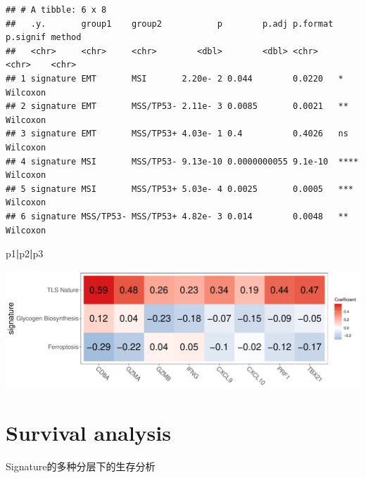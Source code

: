 \documentclass[
  12pt,
]{book}
\newenvironment{Shaded}{\begin{snugshade}}{\end{snugshade}}
\newcommand{\NormalTok}[1]{#1}
\newcommand{\SpecialCharTok}[1]{\textcolor[rgb]{0.81,0.36,0.00}{\textbf{#1}}}
\theoremstyle{definition}
\theoremstyle{definition}
\theoremstyle{definition}
\theoremstyle{definition}
\theoremstyle{remark}
\begin{document}
\begin{verbatim}
## # A tibble: 6 x 8
##   .y.       group1    group2           p        p.adj p.format p.signif method  
##   <chr>     <chr>     <chr>        <dbl>        <dbl> <chr>    <chr>    <chr>   
## 1 signature EMT       MSI       2.20e- 2 0.044        0.0220   *        Wilcoxon
## 2 signature EMT       MSS/TP53- 2.11e- 3 0.0085       0.0021   **       Wilcoxon
## 3 signature EMT       MSS/TP53+ 4.03e- 1 0.4          0.4026   ns       Wilcoxon
## 4 signature MSI       MSS/TP53- 9.13e-10 0.0000000055 9.1e-10  ****     Wilcoxon
## 5 signature MSI       MSS/TP53+ 5.03e- 4 0.0025       0.0005   ***      Wilcoxon
## 6 signature MSS/TP53- MSS/TP53+ 4.82e- 3 0.014        0.0048   **       Wilcoxon
\end{verbatim}

\begin{Shaded}
\begin{Highlighting}[]
\NormalTok{p1}\SpecialCharTok{|}\NormalTok{p2}\SpecialCharTok{|}\NormalTok{p3}
\end{Highlighting}
\end{Shaded}

\begin{center}\includegraphics{_main_files/figure-latex/unnamed-chunk-48-1} \end{center}

\hypertarget{survival-analysis}{%
\section{Survival analysis}\label{survival-analysis}}

Signature的多种分层下的生存分析
\end{document}
